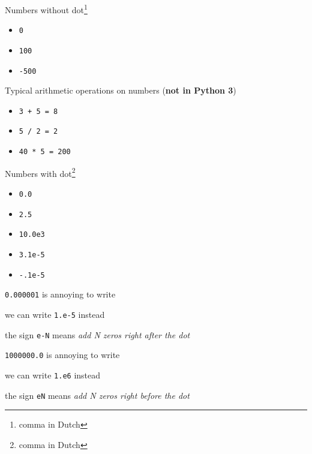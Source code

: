 \documentclass{beamer}
\begin{document}
\begin{slide}{
\item Numbers without dot\footnote{comma in Dutch}
\begin{itemize}
\item \texttt{0}
\item \texttt{100} 
\item \texttt{-500}
\end{itemize}
}\end{slide}

\begin{slide}{
\item Typical arithmetic operations on numbers (\textbf{not in Python 3})
\begin{itemize}
\item \texttt{3 + 5 = 8}
\item \texttt{5 / 2 = 2}
\item \texttt{40 * 5 = 200}
\end{itemize} 
}\end{slide}

\begin{slide}{
\item Numbers with dot\footnote{comma in Dutch}
\begin{itemize}
\item \texttt{0.0}
\item \texttt{2.5}
\item \texttt{10.0e3}
\item \texttt{3.1e-5}
\item \texttt{-.1e-5}
\end{itemize}
}\end{slide}

\begin{slide}{
\item \texttt{0.000001} is annoying to write
\item we can write \texttt{1.e-5} instead
\item the sign \texttt{e-N} means \textit{add N zeros right after the dot}
}\end{slide}

\begin{slide}{
\item \texttt{1000000.0} is annoying to write
\item we can write \texttt{1.e6} instead
\item the sign \texttt{eN} means \textit{add N zeros right before the dot}
}\end{slide}
\end{document}
